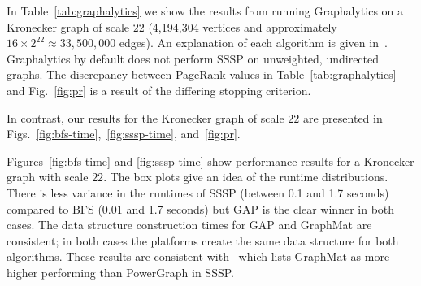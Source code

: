 \documentclass[conference]{IEEEtran}
\begin{document}
In Table~\ref{tab:graphalytics} we show the results from running Graphalytics on a Kronecker graph of scale $22$ (4,194,304 vertices and approximately $16 \times 2^{22} \approx 33,500,000$ edges). An explanation of each algorithm is given in~\cite{Iosup:2016:Graphalyticstech}. Graphalytics by default does not perform SSSP on unweighted, undirected graphs. The discrepancy between PageRank values in Table~\ref{tab:graphalytics} and Fig.~\ref{fig:pr} is a result of the differing stopping criterion.

In contrast, our results for the Kronecker graph of scale $22$ are presented in Figs.~\ref{fig:bfs-time},~\ref{fig:sssp-time}, and~\ref{fig:pr}.


Figures~\ref{fig:bfs-time} and \ref{fig:sssp-time} show performance results for a Kronecker graph with scale $22$. The box plots give an idea of the runtime distributions. There is less variance in the runtimes of SSSP (between 0.1 and 1.7 seconds) compared to BFS (0.01 and 1.7 seconds) but GAP is the clear winner in both cases. The data structure construction times for GAP and GraphMat are consistent; in both cases the platforms create the same data structure for both algorithms. These results are consistent with~\cite{Sundaram:2015:GraphMat} which lists GraphMat as more higher performing than PowerGraph in SSSP.
\end{document}

